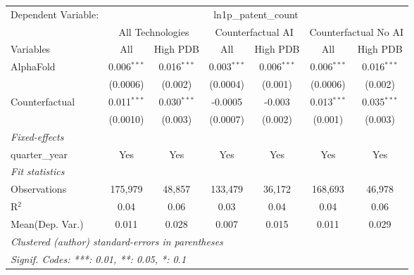 \begingroup
\centering
\begin{tabular}{lcccccc}
   \tabularnewline \midrule \midrule
   Dependent Variable: & \multicolumn{6}{c}{ln1p\_patent\_count}\\
 & \multicolumn{2}{c}{All Technologies} & \multicolumn{2}{c}{Counterfactual AI} & \multicolumn{2}{c}{Counterfactual No AI} \\
\cmidrule(lr){1-1}\cmidrule(lr){2-3} \cmidrule(lr){4-5} \cmidrule(lr){6-7}
Variables & \multicolumn{1}{c}{All} & \multicolumn{1}{c}{High PDB} & \multicolumn{1}{c}{All} & \multicolumn{1}{c}{High PDB} & \multicolumn{1}{c}{All} & \multicolumn{1}{c}{High PDB} \\
\cmidrule(lr){1-1}\cmidrule(lr){2-2} \cmidrule(lr){3-3} \cmidrule(lr){4-4} \cmidrule(lr){5-5} \cmidrule(lr){6-6} \cmidrule(lr){7-7}
   AlphaFold      & 0.006$^{***}$ & 0.016$^{***}$ & 0.003$^{***}$ & 0.006$^{***}$ & 0.006$^{***}$ & 0.016$^{***}$\\   
                  & (0.0006)      & (0.002)       & (0.0004)      & (0.001)       & (0.0006)      & (0.002)\\   
   Counterfactual & 0.011$^{***}$ & 0.030$^{***}$ & -0.0005       & -0.003        & 0.013$^{***}$ & 0.035$^{***}$\\   
                  & (0.0010)      & (0.003)       & (0.0007)      & (0.002)       & (0.001)       & (0.003)\\   
   \midrule
   \emph{Fixed-effects}\\
   quarter\_year  & Yes           & Yes           & Yes           & Yes           & Yes           & Yes\\  
   \midrule
   \emph{Fit statistics}\\
   Observations   & 175,979       & 48,857        & 133,479       & 36,172        & 168,693       & 46,978\\  
   R$^2$          & 0.04          & 0.06          & 0.03          & 0.04          & 0.04          & 0.06\\  
Mean(Dep. Var.) & 0.011 & 0.028 & 0.007 & 0.015 & 0.011 & 0.029 \\
   \midrule \midrule
   \multicolumn{7}{l}{\emph{Clustered (author) standard-errors in parentheses}}\\
   \multicolumn{7}{l}{\emph{Signif. Codes: ***: 0.01, **: 0.05, *: 0.1}}\\
\end{tabular}
\par\endgroup
